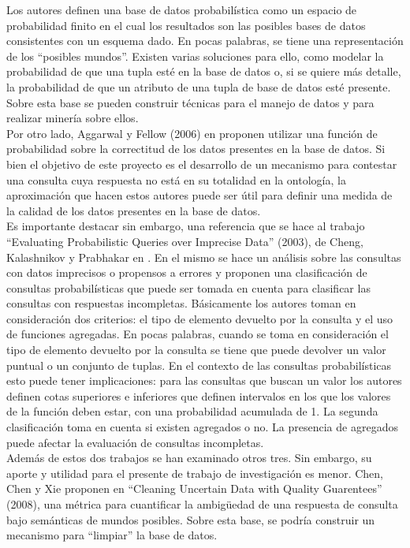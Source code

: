 Los autores definen  una base de datos probabilística como un espacio de probabilidad finito en el cual los resultados son las posibles bases de datos consistentes con un esquema dado. En pocas palabras, se tiene una representación de los “posibles mundos”. Existen varias soluciones para ello, como modelar la probabilidad de que una tupla esté en la base de datos o, si se quiere más detalle, la probabilidad de que un atributo de una tupla de base de datos esté presente. Sobre esta base se pueden construir técnicas para el manejo de datos y para realizar minería sobre ellos. \\

Por otro lado, Aggarwal y Fellow (2006) en \cite{surveyUDAA} proponen  utilizar una función de probabilidad sobre la correctitud de los datos presentes en la base de datos. Si bien el objetivo de este proyecto es el desarrollo de un mecanismo para contestar una consulta cuya respuesta no está en su totalidad en la ontología, la aproximación que hacen estos autores puede ser útil para definir una medida de la calidad de los datos presentes en la base de datos. \\

Es importante destacar sin embargo, una referencia que se hace al trabajo “Evaluating Probabilistic Queries over Imprecise Data” (2003), de Cheng, Kalashnikov y Prabhakar en \cite{evaluatingProbabilisticQueriesOverImpreciseData}. En el mismo se hace un análisis sobre las consultas con datos imprecisos o propensos a errores y proponen una clasificación de consultas probabilísticas que puede ser tomada en cuenta para clasificar las consultas con respuestas incompletas. Básicamente los autores toman en consideración dos criterios: el tipo de elemento devuelto por la consulta y el uso de funciones agregadas. En pocas palabras, cuando se toma en consideración el tipo de elemento devuelto por la consulta se tiene que puede devolver un valor puntual o un conjunto de tuplas. En el contexto de las consultas probabilísticas esto puede tener implicaciones: para las consultas que buscan un valor los autores definen cotas superiores e inferiores que definen intervalos en los que los valores de la función deben estar, con una probabilidad acumulada de 1. La segunda clasificación toma en cuenta si existen agregados o no. La presencia de agregados puede afectar la evaluación de consultas incompletas. \\

Además de estos dos trabajos se han examinado otros tres. Sin embargo, su aporte y utilidad  para el presente de trabajo de investigación es menor. Chen, Chen y Xie proponen en “Cleaning Uncertain Data with Quality Guarentees” (2008)\cite{cleaningUncertainDataWithQualityGuarantees}, una métrica para cuantificar la ambigüedad de una respuesta de consulta bajo semánticas de mundos posibles. Sobre esta base, se podría construir un mecanismo para “limpiar” la base de datos. \\

